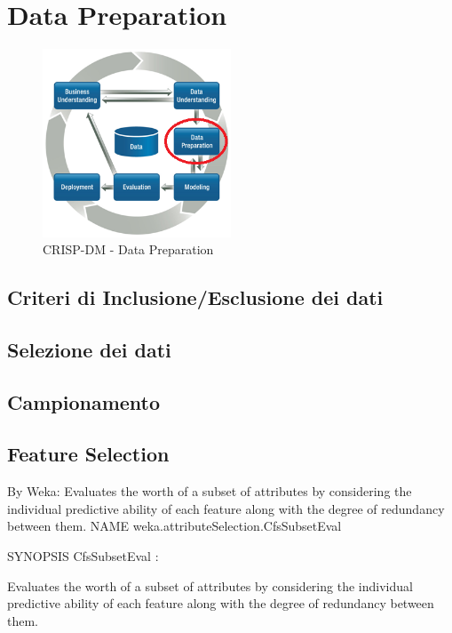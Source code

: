 \chapter{Data Preparation}

\begin{figure}[hbtp]
	\centering
	\includegraphics[width=0.5\textwidth]{./images/CRISPDM_3.png}
	\caption{CRISP-DM - Data Preparation}
	\label{CRISPDM_3}
\end{figure}



\section{Criteri di Inclusione/Esclusione dei dati}

\section{Selezione dei dati}

\section{Campionamento}


\section{Feature Selection}
By Weka:
Evaluates the worth of a subset of attributes by considering the individual predictive ability of each feature along with the degree of redundancy between them.
NAME
weka.attributeSelection.CfsSubsetEval

SYNOPSIS
CfsSubsetEval :

Evaluates the worth of a subset of attributes by considering the individual predictive ability of each feature along with the degree of redundancy between them.

